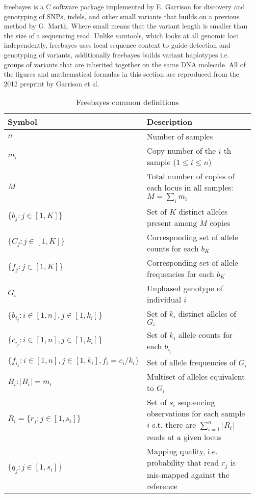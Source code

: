 freebayes\autocite{garrison2012haplotype} is a C software package implemented by E. Garrison for discovery and genotyping of SNPs, indels, and other small variants that builds on a previous method by G. Marth\autocite{marth1999general}. Where small means that the variant length is smaller than the size of a sequencing read. Unlike samtools, which looks at all genomic loci independently, freebayes uses local sequence context to guide detection and genotyping of variants, additionally freebayes builds variant haplotypes\autocite{daly2001high} i.e. groups of variants that are inherited together on the same DNA molecule. All of the figures and mathematical formulas in this section are reproduced from the 2012 preprint by Garrison et al\autocite{garrison2012haplotype}.

\begin{table}[!htb]
    \caption{Freebayes common definitions}
    \label{tab:freebayes_notation}
    {\begin{tabular}{lp{7cm}}
    \toprule
    Symbol & Description \\
    \midrule
    $n$ & Number of samples \\
    $m_i$ & Copy number of the $i$-th sample ($1\le i\le n$)\\
    $M$ & Total number of copies of each locus in all samples: $M=\sum_i m_i$\\
    $\{b_j: j \in [1,K]\}$ & Set of $K$ distinct alleles present among $M$ copies\\
    $\{C_j: j \in [1,K]\}$ & Corresponding set of allele counts for each $b_K$\\
    $\{f_j: j \in [1,K]\}$ & Corresponding set of allele frequencies for each $b_K$\\
    $G_i$ & Unphased genotype of individual $i$\\
    $\{b_{i_{j}}: i \in [1,n], j \in [1,k_i]\}$ & Set of $k_i$ distinct alleles of $G_i$\\
    $\{c_{i_{j}}: i \in [1,n], j \in [1,k_i]\}$ & Set of $k_i$ allele counts for each $b_{i_{j}}$\\
    $\{f_{i_{j}}: i \in [1,n], j \in [1,k_i], f_i = c_i/k_i\}$ & Set of allele frequencies of $G_i$\\
    $B_i:|B_i| = m_i$ & Multiset of alleles equivalent to $G_i$\\
    $R_i = \{r_j: j \in [1,s_i]\} $ & Set of $s_i$ sequencing observations for each sample $i$ s.t. there are $\sum_{i=1}^n |R_i|$ reads at a given locus\\
    $\{q_j : j \in [1,s_i]\}$ & Mapping quality, i.e. probability that read $r_j$ is mis-mapped against the reference\\
    \bottomrule
    \end{tabular}}
\end{table}

